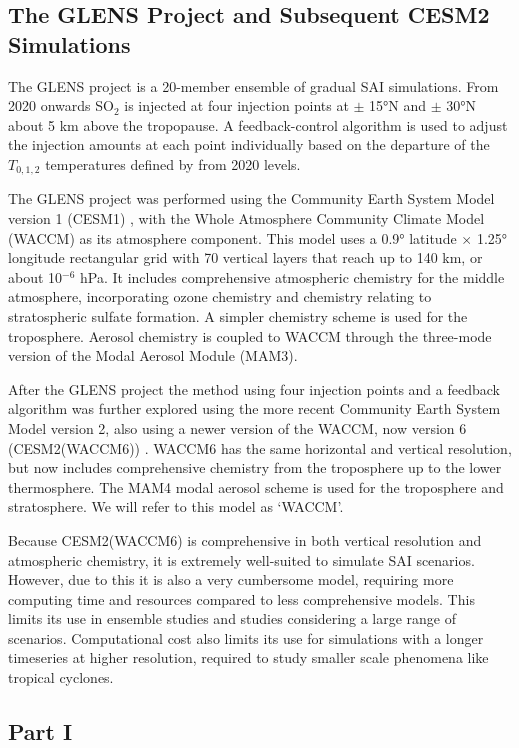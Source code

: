 \subsection{The GLENS Project and Subsequent CESM2 Simulations}
The GLENS project is a 20-member ensemble of gradual SAI simulations. From 2020 onwards SO$_2$ is injected at four injection points at $\pm$ 15°N and $\pm$ 30°N about 5 km above the tropopause. A feedback-control algorithm is used to adjust the injection amounts at each point individually based on the departure of the $T_{0,1,2}$ temperatures defined by \textcite{kravitz2016} from 2020 levels.

The GLENS project was performed using the Community Earth System Model version 1 (CESM1) \parencite{hurrell2013}, with the Whole Atmosphere Community Climate Model (WACCM) as its atmosphere component. This model uses a 0.9° latitude $\times$ 1.25° longitude rectangular grid with 70 vertical layers that reach up to 140 km, or about 10$^{-6}$ hPa. It includes comprehensive atmospheric chemistry for the middle atmosphere, incorporating ozone chemistry and chemistry relating to stratospheric sulfate formation. A simpler chemistry scheme is used for the troposphere. Aerosol chemistry is coupled to WACCM through the three-mode version of the Modal Aerosol Module (MAM3).

After the GLENS project the method using four injection points and a feedback algorithm was further explored using the more recent Community Earth System Model version 2, also using a newer version of the WACCM, now version 6 (CESM2(WACCM6)) \parencite{tilmes2020}. WACCM6 has the same horizontal and vertical resolution, but now includes comprehensive chemistry from the troposphere up to the lower thermosphere. The MAM4 modal aerosol scheme is used for the troposphere and stratosphere. We will refer to this model as `WACCM'.

Because CESM2(WACCM6) is comprehensive in both vertical resolution and atmospheric chemistry, it is extremely well-suited to simulate SAI scenarios. However, due to this it is also a very cumbersome model, requiring more computing time and resources compared to less comprehensive models. This limits its use in ensemble studies and studies considering a large range of scenarios. Computational cost also limits its use for simulations with a longer timeseries at higher resolution, required to study smaller scale phenomena like tropical cyclones. 

\subsection*{Part I}

